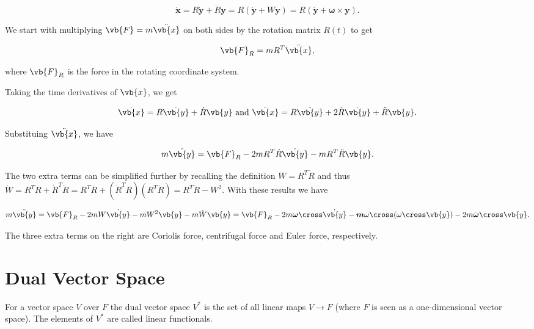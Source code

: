 \documentclass[a4paper,12pt]{report}
\begin{document}
\begin{equation}
\dot{\mathbf{x}} = R \dot{\mathbf{y}} + \dot{R} \mathbf{y} = R (\dot{\mathbf{y}} + W \mathbf{y}) = R (\dot{\mathbf{y}} + \boldsymbol{\omega} \times \mathbf{y}) .
\end{equation}

We start with multiplying \(\vb{F} = m \ddot{\vb{x} } \) on both sides by the rotation matrix \(R(t)\) to get

\begin{equation}
    \vb{F} _{R} = mR^{T}\ddot{\vb{x} },   
\end{equation}

where \(\vb{F} _{R} \) is the force in the rotating coordinate system.

Taking the time derivatives of \(\vb{x} \), we get 

\begin{equation}
    \dot{\vb{x} } = R \dot{\vb{y} } + \dot{R} \vb{y} \text { and } \ddot{\vb{x} } = R \ddot{\vb{y} } + 2\dot{R} \dot{\vb{y} } + \ddot{R} \vb{y} .   
\end{equation}

Substituing \(\ddot{\vb{x} } \), we have

\begin{equation}
    m \ddot{\vb{y} } = \vb{F} _{R} - 2mR^{T}\dot{R} \dot{\vb{y} } - mR^{T} \ddot{R} \vb{y} .      
\end{equation}

The two extra terms can be simplified further by recalling the definition \(W = R^{T}\dot{R}  \) and thus \(\dot{W} = R^{T} \ddot{R} + \dot{R} ^{T} \dot{R} = R^{T}\ddot{R} + (\dot{R} ^{T}R )(R^{T}\dot{R}  ) = R^{T}\ddot{R} - W^2      \). With these results we have

\begin{equation}
    m \ddot{\vb{y} }  = \vb{F} _{R} - 2mW \dot{\vb{y} } - mW^2 \vb{y}  - m \dot{W} \vb{y} = \vb{F} _{R} - 2m \boldsymbol{\omega }\cross \dot{\vb{y} } - \boldsymbol{m} \omega \cross (\omega \cross \vb{y} ) - 2m \dot{\boldsymbol{\omega } }\cross \vb{y} .       
\end{equation}

The three extra terms on the right are Coriolis force, centrifugal force and Euler force, respectively.

\section{Dual Vector Space}

\begin{definition}
    For a vector space \(V\) over \(F\) the dual vector space \(V^*\) is the set of all linear maps \(V \to F\) (where \(F\) is seen as a one-dimensional vector space). The elements of \(V^*\) are called linear functionals.   
\end{definition}
\end{document}
